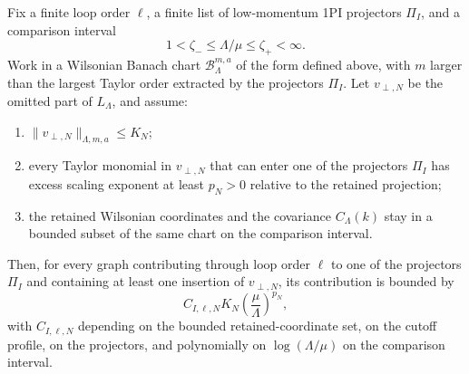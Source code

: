 \begin{lemma}
\label{lem:low-momentum-taylor-remainder-wilsonian}
Fix a finite loop order \(\ell\), a finite list of low-momentum 1PI projectors
\(\Pi_I\), and a comparison interval
\[
  1<\zeta_- \leq \Lambda/\mu \leq \zeta_+ <\infty .
\]
Work in a Wilsonian Banach chart \(\mathcal B_{\Lambda}^{m,a}\) of the form
defined above, with \(m\) larger than the largest Taylor order extracted by
the projectors \(\Pi_I\).  Let \(v_{\perp,N}\) be the omitted part of
\(L_\Lambda\), and assume:
\begin{enumerate}[label=(\roman*)]
  \item \(\|v_{\perp,N}\|_{\Lambda,m,a}\leq K_N\);
  \item every Taylor monomial in \(v_{\perp,N}\) that can enter one of the
  projectors \(\Pi_I\) has excess scaling exponent at least \(p_N>0\) relative
  to the retained projection;
  \item the retained Wilsonian coordinates and the covariance
  \(C_\Lambda(k)\) stay in a bounded subset of the same chart on the
  comparison interval.
\end{enumerate}
Then, for every graph contributing through loop order \(\ell\) to one of the
projectors \(\Pi_I\) and containing at least one insertion of
\(v_{\perp,N}\), its contribution is bounded by
\[
  C_{I,\ell,N} K_N
  \left(\frac{\mu}{\Lambda}\right)^{p_N},
\]
with \(C_{I,\ell,N}\) depending on the bounded retained-coordinate set, on the
cutoff profile, on the projectors, and polynomially on
\(\log(\Lambda/\mu)\) on the comparison interval.
\end{lemma}

